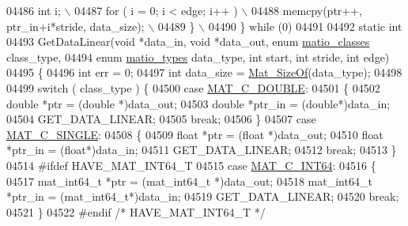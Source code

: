 \begin{DoxyCode}
{{{{{{{{{{{{{{{{{{{{{{{{{04486 \textcolor{preprocessor}{            int i; \(\backslash\)}
04487 \textcolor{preprocessor}{            for ( i = 0; i < edge; i++ ) \(\backslash\)}
04488 \textcolor{preprocessor}{                memcpy(ptr++, ptr\_in+i*stride, data\_size); \(\backslash\)}
04489 \textcolor{preprocessor}{        \} \(\backslash\)}
04490 \textcolor{preprocessor}{    \} while (0)}
04491 
04492 \textcolor{keyword}{static} \textcolor{keywordtype}{int}
04493 GetDataLinear(\textcolor{keywordtype}{void} *data\_in, \textcolor{keywordtype}{void} *data\_out, \textcolor{keyword}{enum} \hyperlink{group___m_a_t_gad4d60ae7b709fc81bfd744fb4c857c40}{matio\_classes} class\_type,
04494     \textcolor{keyword}{enum} \hyperlink{group___m_a_t_gacf7b3b879282b7ab3a51190e49bf3453}{matio\_types} data\_type, \textcolor{keywordtype}{int} start, \textcolor{keywordtype}{int} stride, \textcolor{keywordtype}{int} edge)
04495 \{
04496     \textcolor{keywordtype}{int} err = 0;
04497     \textcolor{keywordtype}{int} data\_size = \hyperlink{group__mat__util_gab6774aabdc124c540c1e7686d0804940}{Mat\_SizeOf}(data\_type);
04498 
04499     \textcolor{keywordflow}{switch} ( class\_type ) \{
04500         \textcolor{keywordflow}{case} \hyperlink{group___m_a_t_ggad4d60ae7b709fc81bfd744fb4c857c40a5d70e0862e5bdb7bd86bf7ba5948f307}{MAT\_C\_DOUBLE}:
04501         \{
04502             \textcolor{keywordtype}{double} *ptr = (\textcolor{keywordtype}{double} *)data\_out;
04503             \textcolor{keywordtype}{double} *ptr\_in = (\textcolor{keywordtype}{double}*)data\_in;
04504             GET\_DATA\_LINEAR;
04505             \textcolor{keywordflow}{break};
04506         \}
04507         \textcolor{keywordflow}{case} \hyperlink{group___m_a_t_ggad4d60ae7b709fc81bfd744fb4c857c40a2825631e26a961cbe0f79db50a39cea2}{MAT\_C\_SINGLE}:
04508         \{
04509             \textcolor{keywordtype}{float} *ptr = (\textcolor{keywordtype}{float} *)data\_out;
04510             \textcolor{keywordtype}{float} *ptr\_in = (\textcolor{keywordtype}{float}*)data\_in;
04511             GET\_DATA\_LINEAR;
04512             \textcolor{keywordflow}{break};
04513         \}
04514 \textcolor{preprocessor}{#ifdef HAVE\_MAT\_INT64\_T}
04515         \textcolor{keywordflow}{case} \hyperlink{group___m_a_t_ggad4d60ae7b709fc81bfd744fb4c857c40a1ea83bcde49b35477494412973f82409}{MAT\_C\_INT64}:
04516         \{
04517             mat\_int64\_t *ptr = (mat\_int64\_t *)data\_out;
04518             mat\_int64\_t *ptr\_in = (mat\_int64\_t*)data\_in;
04519             GET\_DATA\_LINEAR;
04520             \textcolor{keywordflow}{break};
04521         \}
04522 \textcolor{preprocessor}{#endif }\textcolor{comment}{/* HAVE\_MAT\_INT64\_T */}\textcolor{preprocessor}{}
}}}}}}}}}}}}}}}}}}}}}}}}}
\end{DoxyCode}

